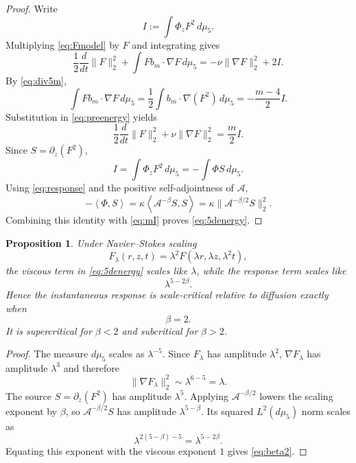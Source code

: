 \documentclass[11pt]{article}
\newtheorem{proposition}[theorem]{Proposition}
\theoremstyle{definition}
\newcommand{\A}{\mathcal A}
\newcommand{\ip}[2]{\left\langle #1,#2\right\rangle}
\begin{document}
\begin{proof}
Write
\[
 I:=\int \Phi_zF^2\,d\mu_5.
\]
Multiplying \eqref{eq:Fmodel} by $F$ and integrating gives
\begin{equation}\label{eq:preenergy}
 \frac12\frac{d}{dt}\|F\|_2^2
 +\int F b_m\cdot\nabla F\,d\mu_5
 =-\nu\|\nabla F\|_2^2+2I.
\end{equation}
By \eqref{eq:div5m},
\[
 \int F b_m\cdot\nabla F\,d\mu_5
 =\frac12\int b_m\cdot\nabla(F^2)\,d\mu_5
 =-\frac{m-4}{2}I.
\]
Substitution in \eqref{eq:preenergy} yields
\begin{equation}\label{eq:mI}
 \frac12\frac{d}{dt}\|F\|_2^2+\nu\|\nabla F\|_2^2
 =\frac m2 I.
\end{equation}
Since $S=\partial_z(F^2)$,
\[
 I=\int\Phi_zF^2\,d\mu_5
 =-\int\Phi S\,d\mu_5.
\]
Using \eqref{eq:response} and the positive self-adjointness of $\A$,
\[
 -\ip{\Phi}{S}
 =\kappa\ip{\A^{-\beta}S}{S}
 =\kappa\|\A^{-\beta/2}S\|_2^2.
\]
Combining this identity with \eqref{eq:mI} proves \eqref{eq:5denergy}.
\end{proof}

\begin{proposition}\label{prop:scaling}
Under Navier--Stokes scaling
\begin{equation}\label{eq:Fscale}
 F_\lambda(r,z,t)=\lambda^2F(\lambda r,\lambda z,\lambda^2t),
\end{equation}
the viscous term in \eqref{eq:5denergy} scales like $\lambda$, while the response term scales like
\begin{equation}\label{eq:response-scale}
 \lambda^{5-2\beta}.
\end{equation}
Hence the instantaneous response is scale-critical relative to diffusion exactly when
\begin{equation}\label{eq:beta2}
 \beta=2.
\end{equation}
It is supercritical for $\beta<2$ and subcritical for $\beta>2$.
\end{proposition}

\begin{proof}
The measure $d\mu_5$ scales as $\lambda^{-5}$.  Since $F_\lambda$ has amplitude $\lambda^2$, $\nabla F_\lambda$ has amplitude $\lambda^3$ and therefore
\[
 \|\nabla F_\lambda\|_2^2
 \sim\lambda^{6-5}=\lambda.
\]
The source $S=\partial_z(F^2)$ has amplitude $\lambda^5$.  Applying $\A^{-\beta/2}$ lowers the scaling exponent by $\beta$, so $\A^{-\beta/2}S$ has amplitude $\lambda^{5-\beta}$.  Its squared $L^2(d\mu_5)$ norm scales as
\[
 \lambda^{2(5-\beta)-5}=\lambda^{5-2\beta}.
\]
Equating this exponent with the viscous exponent $1$ gives \eqref{eq:beta2}.
\end{proof}
\end{document}
